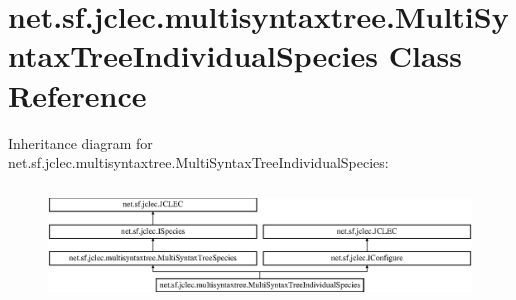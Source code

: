 \hypertarget{classnet_1_1sf_1_1jclec_1_1multisyntaxtree_1_1_multi_syntax_tree_individual_species}{\section{net.\-sf.\-jclec.\-multisyntaxtree.\-Multi\-Syntax\-Tree\-Individual\-Species Class Reference}
\label{classnet_1_1sf_1_1jclec_1_1multisyntaxtree_1_1_multi_syntax_tree_individual_species}
}
Inheritance diagram for net.\-sf.\-jclec.\-multisyntaxtree.\-Multi\-Syntax\-Tree\-Individual\-Species\-:\begin{figure}[H]
\begin{center}
\leavevmode
\includegraphics[height=3.085400cm]{classnet_1_1sf_1_1jclec_1_1multisyntaxtree_1_1_multi_syntax_tree_individual_species}
\end{center}
\end{figure}
